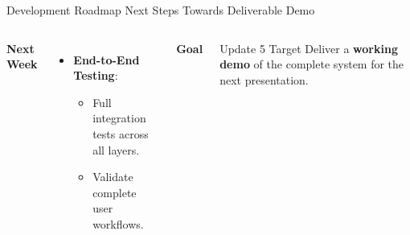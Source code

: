 \documentclass[aspectratio=169, 10pt, xcolor=table]{beamer}
\begin{document}
\begin{frame}{Development Roadmap}
    {Next Steps Towards Deliverable Demo}
    
    \begin{columns}[c]
            
            \vspace{0.8em}
            \pause
            \textbf{Next Week}
            \vspace{0.3em}
            \begin{itemize}
                \item \textbf{End-to-End Testing}:
                \begin{itemize}
                    \item Full integration tests across all layers.
                    \item Validate complete user workflows.
                \end{itemize}
            \end{itemize}

            \pause
            \textbf{Goal}
            \vspace{0.3em}
            \begin{block}{Update 5 Target}
                Deliver a \textbf{working demo} of the complete system for the next presentation.
            \end{block}
    \end{columns}
\end{frame}

\end{document}
